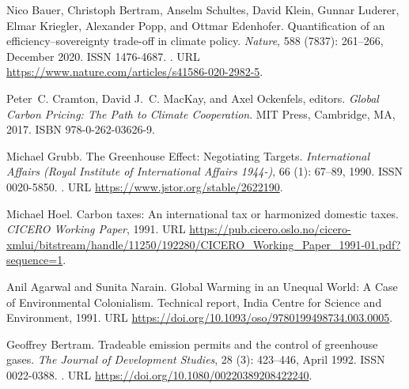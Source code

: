 \documentclass[12pt,english]{article}
\begin{document}
\begin{thebibliography}{55}
  Nico Bauer, Christoph Bertram, Anselm Schultes, David Klein, Gunnar Luderer,
    Elmar Kriegler, Alexander Popp, and Ottmar Edenhofer.
  \newblock Quantification of an efficiency--sovereignty trade-off in climate
    policy.
  \newblock \emph{Nature}, 588 (7837): 261--266, December 2020.
  \newblock ISSN 1476-4687.
  \newblock {}.
  \newblock URL \url{https://www.nature.com/articles/s41586-020-2982-5}.
  
  Peter~C. Cramton, David J.~C. MacKay, and Axel Ockenfels, editors.
  \newblock \emph{Global Carbon Pricing: The Path to Climate Cooperation}.
  \newblock MIT Press, Cambridge, MA, 2017.
  \newblock ISBN 978-0-262-03626-9.
  
  Michael Grubb.
  \newblock The {{Greenhouse Effect}}: {{Negotiating Targets}}.
  \newblock \emph{International Affairs (Royal Institute of International Affairs
    1944-)}, 66 (1): 67--89, 1990.
  \newblock ISSN 0020-5850.
  \newblock {}.
  \newblock URL \url{https://www.jstor.org/stable/2622190}.
  
  Michael Hoel.
  \newblock Carbon taxes: {{An}} international tax or harmonized domestic taxes.
  \newblock \emph{CICERO Working Paper}, 1991.
  \newblock URL
    \url{https://pub.cicero.oslo.no/cicero-xmlui/bitstream/handle/11250/192280/CICERO\_Working\_Paper\_1991-01.pdf?sequence=1}.
  
  Anil Agarwal and Sunita Narain.
  \newblock Global {{Warming}} in an {{Unequal World}}: {{A Case}} of
    {{Environmental Colonialism}}.
  \newblock Technical report, {India Centre for Science and Environment}, 1991.
  \newblock URL \url{https://doi.org/10.1093/oso/9780199498734.003.0005}.
  
  Geoffrey Bertram.
  \newblock Tradeable emission permits and the control of greenhouse gases.
  \newblock \emph{The Journal of Development Studies}, 28 (3):
    423--446, April 1992.
  \newblock ISSN 0022-0388.
  \newblock {}.
  \newblock URL \url{https://doi.org/10.1080/00220389208422240}.
  

\end{thebibliography}
\end{document}
